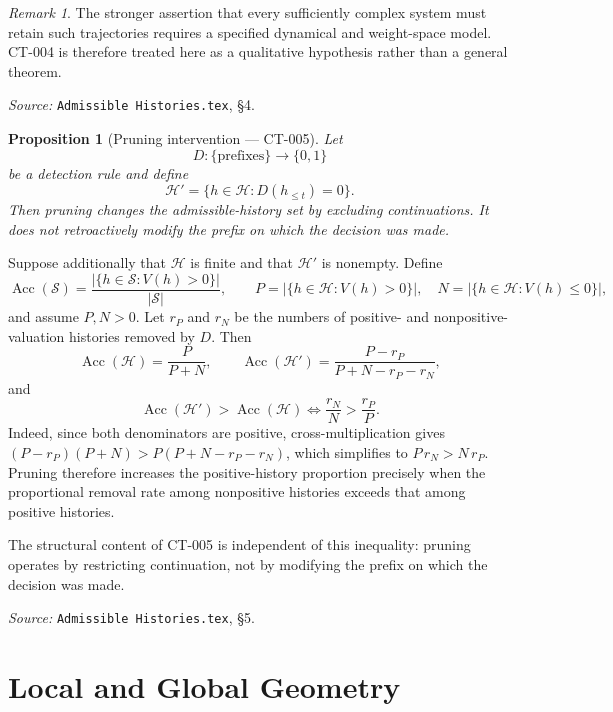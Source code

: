 \documentclass[11pt]{article}
\newtheorem{proposition}[theorem]{Proposition}
\theoremstyle{definition}
\theoremstyle{remark}
\newtheorem{remark}[theorem]{Remark}
\newcommand{\histories}{\mathcal{H}}
\newcommand{\valuation}{V}
\begin{document}
\begin{remark}
The stronger assertion that every sufficiently complex system must retain such
trajectories requires a specified dynamical and weight-space model. CT-004 is
therefore treated here as a qualitative hypothesis rather than a general
theorem.
\end{remark}

\noindent\emph{Source:} \texttt{Admissible Histories.tex}, \S4.

\begin{proposition}[Pruning intervention --- CT-005]
Let
\[
  D:\{\text{prefixes}\}\to\{0,1\}
\]
be a detection rule and define
\[
  \histories'
  =
  \{h\in\histories : D(h_{\leq t})=0\}.
\]
Then pruning changes the admissible-history set by excluding continuations. It
does not retroactively modify the prefix on which the decision was made.
\end{proposition}

Suppose additionally that $\histories$ is finite and that $\histories'$ is
nonempty. Define
\[
  \operatorname{Acc}(\mathcal{S})
  =
  \frac{
    |\{h\in\mathcal{S}:\valuation(h)>0\}|
  }{
    |\mathcal{S}|
  },
  \qquad
  P=|\{h\in\histories:\valuation(h)>0\}|,
  \quad
  N=|\{h\in\histories:\valuation(h)\leq0\}|,
\]
and assume $P,N>0$. Let $r_P$ and $r_N$ be the numbers of positive- and
nonpositive-valuation histories removed by $D$. Then
\[
  \operatorname{Acc}(\histories)=\frac{P}{P+N},
  \qquad
  \operatorname{Acc}(\histories')=\frac{P-r_P}{P+N-r_P-r_N},
\]
and
\[
  \operatorname{Acc}(\histories')>\operatorname{Acc}(\histories)
  \iff
  \frac{r_N}{N}>\frac{r_P}{P}.
\]
Indeed, since both denominators are positive, cross-multiplication gives
$(P-r_P)(P+N)>P(P+N-r_P-r_N)$, which simplifies to $P\,r_N>N\,r_P$.
Pruning therefore increases the positive-history proportion precisely when the
proportional removal rate among nonpositive histories exceeds that among
positive histories.

The structural content of CT-005 is independent of this inequality: pruning
operates by restricting continuation, not by modifying the prefix on which the
decision was made.

\noindent\emph{Source:} \texttt{Admissible Histories.tex}, \S5.

\section{Local and Global Geometry}
\end{document}
